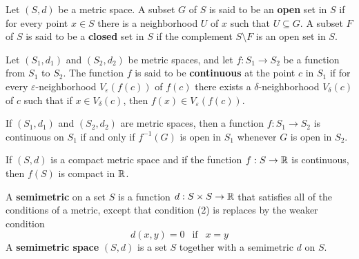 \begin{definition}
	Let $(S,d)$ be a metric space. A subset $G$ of $S$ is said to be an \textbf{open} set in $S$ if for every point $x \in S$ there is a neighborhood $U$ of $x$ such that $U \subseteq G$. A subset $F$ of $S$ is said to be a \textbf{closed} set in $S$ if the complement $S \setminus F$ is an open set in $S$.
\end{definition}

\begin{definition}
	Let $(S_1,d_1)$ and $(S_2,d_2)$ be metric spaces, and let $f:S_1 \to S_2$ be a function from $S_1$ to $S_2$. The function $f$ is said to be \textbf{continuous} at the point $c$ in $S_1$ if for every $\varepsilon$-neighborhood $V_\varepsilon(f(c))$ of $f(c)$ there exists a $\delta$-neighborhood $V_\delta(c)$ of $c$ such that if $x \in V_\delta(c)$, then $f(x)\in V_\varepsilon(f(c))$.
\end{definition}

\begin{theorem}
	If $(S_1,d_1)$ and $(S_2,d_2)$ are metric spaces, then a function $f:S_1 \to S_2$ is continuous on $S_1$ if and only if $f^{-1}(G)$ is open in $S_1$ whenever $G$ is open in $S_2$.
\end{theorem}

\begin{theorem}
	If $(S,d)$ is a compact metric space and if the function $f:S \to \mathbb{R}$ is continuous, then $f(S)$ is compact in $\mathbb{R}$.
\end{theorem}

\begin{definition}
	A \textbf{semimetric} on a set $S$ is a function $d: S\times S \to \mathbb{R}$ that satisfies all of the conditions of a metric, except that condition (2) is replaces by the weaker condition
	\[d(x,y)=0\ \ \text{  if  }\ \ x=y\]
	A \textbf{semimetric space} $(S,d)$ is a set $S$ together with a semimetric $d$ on $S$.
\end{definition}
